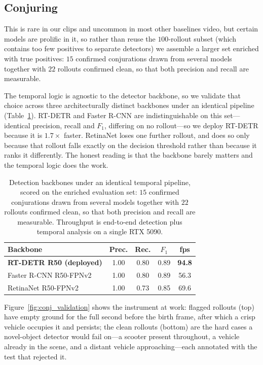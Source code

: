 \documentclass[letterpaper]{article} %
\begin{document}
\subsection{Conjuring}
\label{app:conj}

This is rare in our clips
and uncommon in most other baselines video, but certain models are prolific in it, so rather than reuse the
$100$-rollout subset (which contains too few positives to separate detectors) we assemble
a larger set enriched with true positives: $15$ confirmed
conjurations drawn from several models together with $22$ rollouts confirmed
clean, so that both precision and recall are measurable.

The temporal logic is agnostic to the detector backbone, so we validate that
choice across three architecturally distinct backbones under an identical
pipeline (Table~\ref{tab:val_conj}). RT-DETR and Faster R-CNN \cite{girshick2015fast}
are indistinguishable on this set---identical precision, recall and $F_1$, differing on no
rollout---so we deploy RT-DETR because it is $1.7\times$ faster. RetinaNet \cite{goyal2018focal}
loses one further rollout, and does so only because that rollout falls exactly on the decision
threshold rather than because it ranks it differently. The honest reading is that the backbone
barely matters and the temporal logic does the work.

\begin{table}[t]
\centering
{
\small
\begin{tabular}{lcccc}
\toprule
Backbone & Prec. & Rec. & $F_1$ & fps \\
\midrule
\textbf{RT-DETR R50 (deployed)} & 1.00 & 0.80 & 0.89 & \textbf{94.8} \\
Faster R-CNN R50-FPNv2          & 1.00 & 0.80 & 0.89 & 56.3 \\
RetinaNet R50-FPNv2             & 1.00 & 0.73 & 0.85 & 69.6 \\
\bottomrule
\end{tabular}
}
\caption{
    Detection backbones under an identical temporal pipeline, scored on the
    enriched evaluation set: $15$ confirmed conjurations drawn from several
    models together with $22$ rollouts confirmed clean, so that both precision
    and recall are measurable. Throughput is end-to-end detection plus temporal
    analysis on a single RTX 5090.
}
\label{tab:val_conj}
\end{table}

Figure~\ref{fig:conj_validation} shows the instrument at work: flagged rollouts
(top) have empty ground for the full second before the birth frame, after which a
crisp vehicle occupies it and persists; the clean rollouts (bottom) are the hard
cases a novel-object detector would fail on---a scooter present throughout, a
vehicle already in the scene, and a distant vehicle approaching---each annotated
with the test that rejected it.
\end{document}
